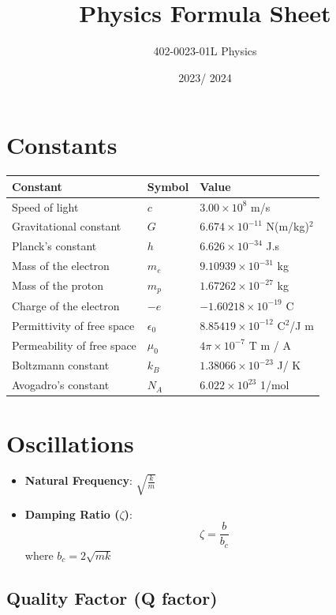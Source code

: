 \documentclass[12pt,a4paper]{article}
\title{Physics Formula Sheet}
\author{402-0023-01L  Physics}
\date{2023/ 2024}
\begin{document}
	\maketitle
	
	\section*{Constants}
	\begin{tabular}{lll}
		\toprule
		Constant & Symbol & Value \\
		\midrule
		Speed of light & \( c \) & \( 3.00 \times 10^8 \) m/s \\
		Gravitational constant & \( G \) & \( 6.674 \times 10^{-11} \) N(m/kg)\(^2\) \\
		Planck's constant & \( h \) & \( 6.626 \times 10^{-34} \) J.s \\
		Mass of the electron & \( m_e \) & \( 9.10939 \times 10^{-31} \) kg \\
		Mass of the proton & \( m_p \) & \( 1.67262 \times 10^{-27} \) kg \\
		Charge of the electron & \(-e\) & \(-1.60218 \times 10^{-19} \) C \\
		Permittivity of free space & \(\epsilon_0\) & \( 8.85419 \times 10^{-12} \) C\(^2\)/J m \\
		Permeability of free space & \(\mu_0\) & \( 4 \pi \times 10^{-7} \) T m / A \\
		Boltzmann constant & \( k_B \) & \( 1.38066 \times 10^{-23} \) J/ K \\
		Avogadro's constant & \( N_A \) & \( 6.022 \times 10^{23} \) 1/mol \\
		\bottomrule
	\end{tabular}
	
	\section*{Oscillations}
	\begin{itemize}
		\item \textbf{Natural Frequency}: \( \sqrt{\frac{k}{m}}\)
		\item \textbf{Damping Ratio (\( \zeta \))}:
		\[
		\zeta = \frac{b}{b_c}
		\]
		where \( b_c = 2\sqrt{mk} \)
	\end{itemize}
	
	\subsection*{Quality Factor (Q factor)}
	
\end{document}

